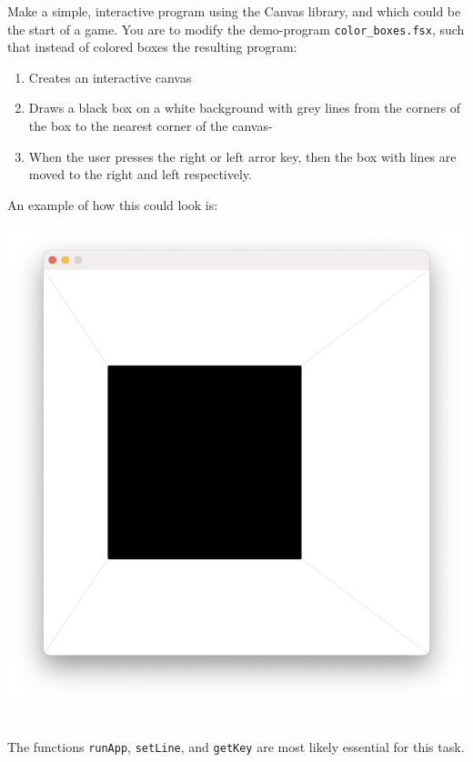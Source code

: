 Make a simple, interactive program using the Canvas library, and which could be the start of a game. You are to modify the demo-program \lstinline[language=console]{color_boxes.fsx}, such that instead of colored boxes the resulting program:
\begin{enumerate}
\item Creates an interactive canvas
\item Draws a black box on a white background with grey lines from the corners of the box to the nearest corner of the canvas-
\item When the user presses the right or left arror key, then the box with lines are moved to the right and left respectively.
\end{enumerate}
An example of how this could look is:\\
\begin{minipage}{\linewidth}
  \centering
  \includegraphics[width=0.6\linewidth]{theBox}
\end{minipage}\\
The functions \lstinline{runApp}, \lstinline{setLine}, and \lstinline{getKey} are most likely essential for this task.

